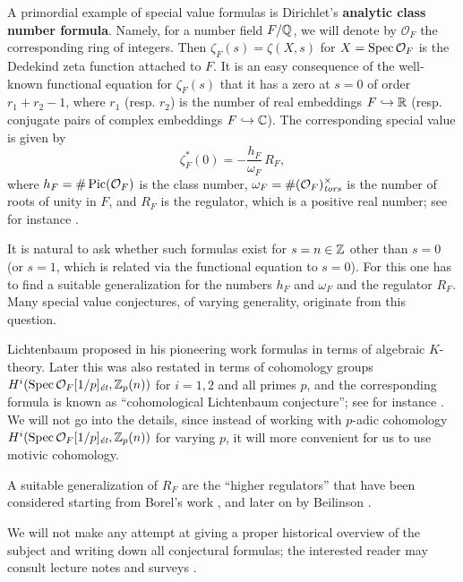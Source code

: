 \documentclass[draft]{article}
\numberwithin{equation}{section}
\begin{document}
A primordial example of special value formulas is Dirichlet's
\textbf{analytic class number formula}. Namely, for a number field $F/\QQ$, we
will denote by $\mathcal{O}_F$ the corresponding ring of integers. Then
$\zeta_F (s) = \zeta (X,s)$ for $X = \Spec \mathcal{O}_F$ is the Dedekind zeta
function attached to $F$.  It is an easy consequence of the well-known
functional equation for $\zeta_F (s)$ that it has a zero at $s = 0$ of order
$r_1 + r_2 - 1$, where $r_1$ (resp. $r_2$) is the number of real embeddings
$F \hookrightarrow \RR$ (resp. conjugate pairs of complex embeddings
$F \hookrightarrow \CC$). The corresponding special value is given by
\begin{equation}
  \label{eqn:zeta-F-at-s=0}
  \zeta^*_F (0) = -\frac{h_F}{\omega_F}\,R_F,
\end{equation}
where $h_F = \# \Pic (\mathcal{O}_F)$ is the class number,
$\omega_F = \# (\mathcal{O}_F)^\times_\tors$ is the number of roots of unity in
$F$, and $R_F$ is the regulator, which is a positive real number;
see for instance \cite[\S VII.5]{Neukirch-1999}.

It is natural to ask whether such formulas exist for $s = n \in \ZZ$ other than
$s = 0$ (or $s = 1$, which is related via the functional equation to $s = 0$).
For this one has to find a suitable generalization for the
numbers $h_F$ and $\omega_F$ and the regulator $R_F$. Many special value
conjectures, of varying generality, originate from this question.

Lichtenbaum proposed in his pioneering work \cite{Lichtenbaum-1973} formulas in
terms of algebraic $K$-theory. Later this was also restated in terms of
cohomology groups $H^i (\Spec \mathcal{O}_F [1/p]_\et, \ZZ_p (n))$
for $i = 1,2$ and all primes $p$, and the corresponding formula is known as
``cohomological Lichtenbaum conjecture''; see for instance
\cite{Huber-Kings-2003}. We will not go into the details, since instead of
working with $p$-adic cohomology
$H^i (\Spec \mathcal{O}_F [1/p]_\et, \ZZ_p (n))$ for varying $p$, it will more
convenient for us to use motivic cohomology.

A suitable generalization of $R_F$ are the ``higher regulators'' that have been
considered starting from Borel's work \cite{Borel-1977}, and later on by
Beilinson \cite{Beilinson-1984}.

We will not make any attempt at giving a proper historical overview of the
subject and writing down all conjectural formulas; the interested reader may
consult lecture notes \cite{Kolster-2004} and surveys
\cite{Goncharov-2005,Kahn-2005}.
\end{document}

